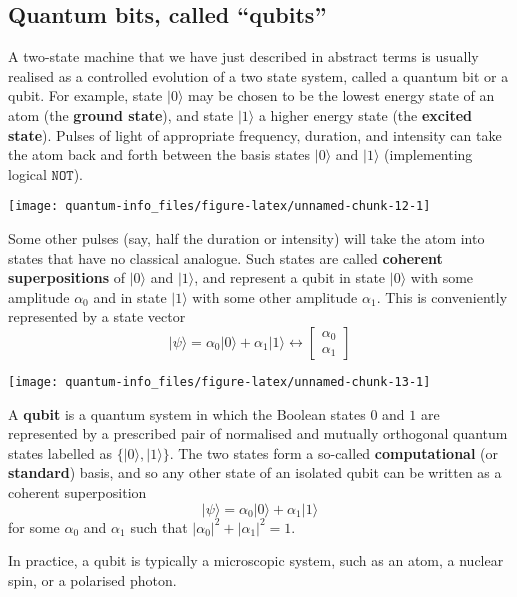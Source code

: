 \documentclass[fleqn]{article}
\newenvironment{idea}{\noindent}{\medskip}
\begin{document}
\hypertarget{quantum-bits-called-qubits}{%
\subsection{Quantum bits, called ``qubits''}\label{quantum-bits-called-qubits}}

A two-state machine that we have just described in abstract terms is usually realised as a controlled evolution of a two state system, called a quantum bit or a qubit.
For example, state \(|0\rangle\) may be chosen to be the lowest energy state of an atom (the \textbf{ground state}), and state \(|1\rangle\) a higher energy state (the \textbf{excited state}).
Pulses of light of appropriate frequency, duration, and intensity can take the atom back and forth between the basis states \(|0\rangle\) and \(|1\rangle\) (implementing logical \(\texttt{NOT}\)).

\begin{center}\texttt{[image: quantum-info\_files/figure-latex/unnamed-chunk-12-1]} \end{center}

Some other pulses (say, half the duration or intensity) will take the atom into states that have no classical analogue.
Such states are called \textbf{coherent superpositions} of \(|0\rangle\) and \(|1\rangle\), and represent a qubit in state \(|0\rangle\) with some amplitude \(\alpha_0\) and in state \(|1\rangle\) with some other amplitude \(\alpha_1\).
This is conveniently represented by a state vector
\[
    |\psi\rangle =
    \alpha_0|0\rangle + \alpha_1|1\rangle
    \leftrightarrow
    \begin{bmatrix}
      \alpha_0
    \\\alpha_1
    \end{bmatrix}
\]

\begin{center}\texttt{[image: quantum-info\_files/figure-latex/unnamed-chunk-13-1]} \end{center}

\begin{idea}

A \textbf{qubit} is a quantum system in which the Boolean states \(0\) and \(1\) are represented by a prescribed pair of normalised and mutually orthogonal quantum states labelled as \(\{|0\rangle,|1\rangle\}\).
The two states form a so-called \textbf{computational} (or \textbf{standard}) basis, and so any other state of an isolated qubit can be written as a coherent superposition
\[
  |\psi\rangle = \alpha_0|0\rangle + \alpha_1|1\rangle
\]
for some \(\alpha_0\) and \(\alpha_1\) such that \(|\alpha_0|^2 + |\alpha_1|^2 = 1\).

In practice, a qubit is typically a microscopic system, such as an atom, a nuclear spin, or a polarised photon.

\end{idea}
\end{document}
